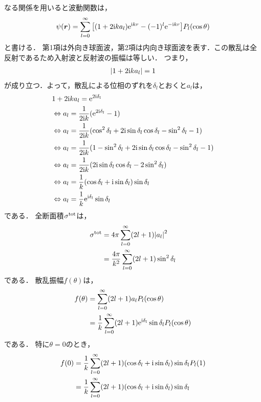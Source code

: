 \documentclass{report}
\begin{document}
  なる関係を用いると波動関数は，
  \begin{align}
    \psi(\bm{r}) = \sum_{l = 0}^{\infty} \qty[(1 + 2\mathrm{i} ka_l)\mathrm{e}^{\mathrm{i} kr} - (-1)^l \mathrm{e}^{-\mathrm{i} kr}]P_l(\cos\theta)\label{SCPartialWave}
  \end{align}
  と書ける．
  第1項は外向き球面波，第2項は内向き球面波を表す．この散乱は全反射であるため入射波と反射波の振幅は等しい．
  つまり，
  \begin{align}
    \abs{1 + 2\mathrm{i} ka_l} = 1
  \end{align}
  が成り立つ．よって，散乱による位相のずれを$\delta_l$とおくと$a_l$は，
  \begin{align}
    &1 + 2\mathrm{i} ka_l = \mathrm{e}^{2\mathrm{i} \delta_l} \\ 
    &\Leftrightarrow a_l = \frac{1}{2\mathrm{i} k}(\mathrm{e}^{2\mathrm{i} \delta_l} - 1) \\
    &\Leftrightarrow a_l = \frac{1}{2\mathrm{i} k}(\cos^2\delta_l + 2\mathrm{i}\sin\delta_l\cos\delta_l - \sin^2\delta_l - 1) \\
    &\Leftrightarrow a_l = \frac{1}{2\mathrm{i} k}(1 - \sin^2\delta_l + 2\mathrm{i}\sin\delta_l\cos\delta_l - \sin^2\delta_l - 1) \\
    &\Leftrightarrow a_l = \frac{1}{2\mathrm{i} k}(2\mathrm{i}\sin\delta_l\cos\delta_l - 2\sin^2\delta_l) \\
    &\Leftrightarrow a_l = \frac{1}{k}(\cos\delta_l + \mathrm{i}\sin\delta_l)\sin\delta_l\\
    &\Leftrightarrow a_l = \frac{1}{k}\mathrm{e}^{\mathrm{i} \delta_l} \sin \delta_l
  \end{align}
  である．
  全断面積$\sigma^{\mathrm{tot}}$は，
  \begin{align}
    \sigma^{\mathrm{tot}} &= 4\pi \sum_{l=0}^{\infty} (2l+1)\abs{a_l}^2 \\
    &= \frac{4\pi}{k^2} \sum_{l=0}^{\infty} (2l+1)\sin^2\delta_l 
  \end{align}
  である．
  散乱振幅$f(\theta)$は，
  \begin{align}
    f(\theta) &= \sum_{l = 0}^{\infty} (2l + 1)a_lP_l(\cos\theta) \\
    &= \frac{1}{k} \sum_{l = 0}^{\infty}(2l + 1)\mathrm{e}^{\mathrm{i}\delta_l}\sin\delta_lP_l(\cos\theta)
  \end{align}
  である．
  特に$\theta = 0$のとき，
  \begin{align}
    f(0) &= \frac{1}{k} \sum_{l = 0}^{\infty} (2l + 1) (\cos\delta_l + \mathrm{i} \sin\delta_l)\sin\delta_l P_l(1) \\ 
    &= \frac{1}{k} \sum_{l = 0}^{\infty} (2l + 1) (\cos\delta_l + \mathrm{i} \sin\delta_l)\sin\delta_l
  \end{align}
\end{document}
